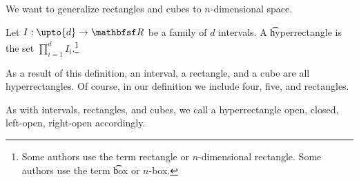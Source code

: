 

We want to generalize rectangles and cubes to $n$-dimensional space.

Let $I: \upto{d} \to \R$ be a family of $d$ intervals.
A \t{hyperrectangle} is the set $\prod_{i=1}^{d} I_i$.\footnote{Some authors use the term rectangle or \t{$n$-dimensional rectangle}. Some authors use the term \t{box} or \t{$n$-box}.}

As a result of this definition, an interval, a rectangle, and a cube are all hyperrectangles.
Of course, in our definition we include four, five, and  rectangles.

As with intervals, rectangles, and cubes, we call a hyperrectangle open, closed, left-open, right-open accordingly.

\blankpage
